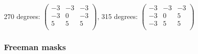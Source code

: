 \documentclass[a4paper]{article}
\begin{document}
\begin{centering}
270 degrees: \begin{math}
   \begin{pmatrix} 
   -3 & -3 & -3 \\ 
   -3 & 0 & -3 \\
   5 & 5 & 5 \\ 
   \end{pmatrix}
\end{math}, 315 degrees: \begin{math}
   \begin{pmatrix} 
   -3 & -3 & -3 \\ 
   -3 & 0 & 5 \\
   -3 & 5 & 5 \\ 
   \end{pmatrix}
\end{math}\\
\end{centering}

\subsubsection{Freeman masks}
\end{document}
